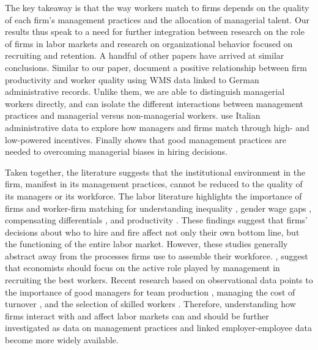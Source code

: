 The key takeaway is that the way workers match to firms depends on the quality of each firm's management practices and the allocation of managerial talent. Our results thus speak to a need for further integration between research on the role of firms in labor markets and research on organizational behavior focused on recruiting and retention. A handful of other papers have arrived at similar conclusions. Similar to our paper, \citet{Bender:Management:JOLE:2018} document a positive relationship between firm productivity and worker quality using WMS data linked to German administrative records. Unlike them, we are able to distinguish managerial workers directly, and can isolate the different interactions between management practices and managerial versus non-managerial workers.
\citet{Bandiera:Matching:JOLE:2015} use Italian administrative data to explore how managers and firms match through high- and low-powered incentives.  Finally \citet{Hoffman:Discretion:QJE:2018} shows that good management practices are needed to overcoming managerial biases in hiring decisions.

Taken together, the literature suggests that the institutional environment in the firm, manifest in its management practices, cannot be reduced to the quality of its managers or its workforce. 
The labor literature highlights the importance of firms and worker-firm matching for understanding inequality \citep{Card2013,Alvarez:Firms:AEJM:2018,Song:Firming:QJE:2018}, gender wage gaps \citep{Card:Bargaining:QJE:2016}, compensating differentials \citep{Lavetti:CDEM:WP:2018,Sorkin:Ranking:QJE:2018}, and productivity \citep{Iranzo2008}. 
These findings suggest that firms' decisions about who to hire and fire affect not only their own bottom line, but the functioning of the entire labor market. 
However, these studies generally abstract away from the processes firms use to assemble their workforce.
\citet{OyerSchaefer:HLE:2011}, suggest that economists should focus on the active role played by management in recruiting the best workers. Recent research based on observational data points to the importance of good managers for team production \citep{shaw_bosses,Hensvik2018}, managing the cost of turnover \citep{Jager2016,Gallen2018}, and
the selection of skilled workers \citep{Friedrich2017}. 
Therefore, understanding how firms interact with and affect labor markets can and should be further investigated as data on management practices and linked employer-employee data become more widely available.




 




